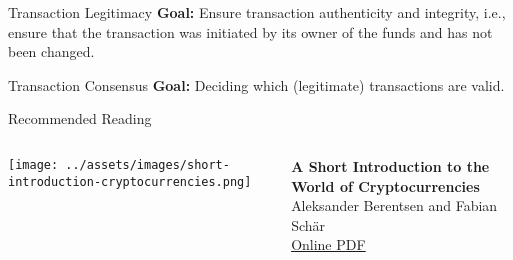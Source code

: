 \documentclass[]{beamer}
\begin{document}
\begin{frame}{Transaction Legitimacy}
\textbf{Goal:} Ensure transaction \color{focus}authenticity \color{black}and \color{focus} integrity\color{black}, i.e., ensure that the transaction was initiated by its owner of the funds and has not been changed.
\uncover<2->{
		\center
		
		}
\uncover<3->{
		\vspace{1em}
		
	}
\end{frame}


\begin{frame}{Transaction Consensus}
\textbf{Goal: }Deciding which (legitimate) transactions are valid. \\
\vspace{1em}
\end{frame}

\begin{frame}{Recommended Reading}
\begin{columns}
	\begin{column}{0.3\textwidth}
	\center
	\texttt{[image: ../assets/images/short-introduction-cryptocurrencies.png]}
	\end{column}
	\begin{column}{0.7\textwidth}
	\textbf{A Short Introduction to the World of Cryptocurrencies} \\
	Aleksander Berentsen and Fabian Schär \\
	\link \href{https://files.stlouisfed.org/files/htdocs/publications/review/2018/01/10/a-short-introduction-to-the-world-of-cryptocurrencies.pdf}{Online PDF}
	\end{column}
\end{columns}
\end{frame}
\end{document}
